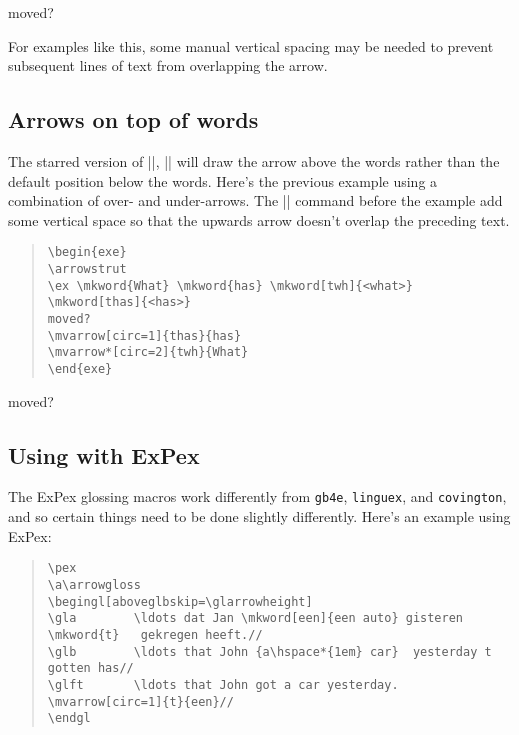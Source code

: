 \documentclass[11pt]{article}
\newcommand*{\pkg}[1]{\texttt{#1}}
\begin{document}
{\begin{exe}
\ex {}    moved?
\setlength{\arrowheight}{4.5ex}
\end{exe}

For examples like this, some manual vertical spacing may be needed to prevent subsequent lines of text from overlapping the arrow.

\subsection{Arrows on top of words}
The starred version of |\mvarrow|, |\mvarrow*| will draw the arrow above the words rather than the default position below the words.  Here’s the previous example using a combination of over- and under-arrows. The |\arrowstrut| command before the example add some vertical space so that the upwards arrow doesn't overlap the preceding text.

\begin{quote}
\begin{lstlisting}
\begin{exe}
\arrowstrut
\ex \mkword{What} \mkword{has} \mkword[twh]{<what>} \mkword[thas]{<has>}
moved? 
\mvarrow[circ=1]{thas}{has} 
\mvarrow*[circ=2]{twh}{What}
\end{exe}
\end{lstlisting}
\end{quote}

\begin{exe}
\arrowstrut
\ex {}   
moved?  
\end{exe}

\subsection{Using with ExPex}
The ExPex glossing macros work differently from \pkg{gb4e}, \pkg{linguex}, and \pkg{covington}, and so certain things need to be done slightly differently. Here's an example using ExPex:

\begin{quote}
\begin{lstlisting}
\pex
\a\arrowgloss
\begingl[aboveglbskip=\glarrowheight]
\gla        \ldots dat Jan \mkword[een]{een auto} gisteren \mkword{t}   gekregen heeft.//
\glb        \ldots that John {a\hspace*{1em} car}  yesterday t  gotten has//
\glft       \ldots that John got a car yesterday.
\mvarrow[circ=1]{t}{een}// 
\endgl
\end{lstlisting}
\end{quote}

}
\end{document}
